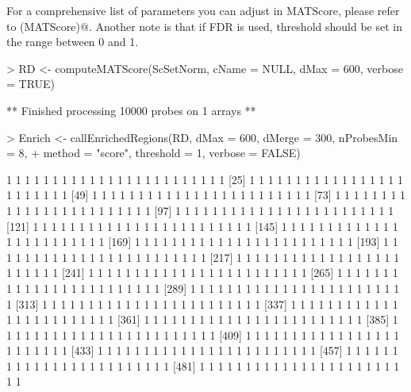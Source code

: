 \documentclass[11pt]{article}
\begin{document}
For a comprehensive list of parameters you can adjust in MATScore, please refer to \verb@help(MATScore)@.
Another note is that if FDR is used, threshold should be set in the range between 0 and 1.

\begin{Schunk}
\begin{Sinput}
> RD <- computeMATScore(ScSetNorm, cName = NULL, dMax = 600, verbose = TRUE)
\end{Sinput}
\begin{Soutput}
** Finished processing  10000  probes on  1  arrays **
\end{Soutput}
\begin{Sinput}
> Enrich <- callEnrichedRegions(RD, dMax = 600, dMerge = 300, nProbesMin = 8, 
+     method = "score", threshold = 1, verbose = FALSE)
\end{Sinput}
\begin{Soutput}
    [1]  1  1  1  1  1  1  1  1  1  1  1  1  1  1  1  1  1  1  1  1  1  1  1  1
   [25]  1  1  1  1  1  1  1  1  1  1  1  1  1  1  1  1  1  1  1  1  1  1  1  1
   [49]  1  1  1  1  1  1  1  1  1  1  1  1  1  1  1  1  1  1  1  1  1  1  1  1
   [73]  1  1  1  1  1  1  1  1  1  1  1  1  1  1  1  1  1  1  1  1  1  1  1  1
   [97]  1  1  1  1  1  1  1  1  1  1  1  1  1  1  1  1  1  1  1  1  1  1  1  1
  [121]  1  1  1  1  1  1  1  1  1  1  1  1  1  1  1  1  1  1  1  1  1  1  1  1
  [145]  1  1  1  1  1  1  1  1  1  1  1  1  1  1  1  1  1  1  1  1  1  1  1  1
  [169]  1  1  1  1  1  1  1  1  1  1  1  1  1  1  1  1  1  1  1  1  1  1  1  1
  [193]  1  1  1  1  1  1  1  1  1  1  1  1  1  1  1  1  1  1  1  1  1  1  1  1
  [217]  1  1  1  1  1  1  1  1  1  1  1  1  1  1  1  1  1  1  1  1  1  1  1  1
  [241]  1  1  1  1  1  1  1  1  1  1  1  1  1  1  1  1  1  1  1  1  1  1  1  1
  [265]  1  1  1  1  1  1  1  1  1  1  1  1  1  1  1  1  1  1  1  1  1  1  1  1
  [289]  1  1  1  1  1  1  1  1  1  1  1  1  1  1  1  1  1  1  1  1  1  1  1  1
  [313]  1  1  1  1  1  1  1  1  1  1  1  1  1  1  1  1  1  1  1  1  1  1  1  1
  [337]  1  1  1  1  1  1  1  1  1  1  1  1  1  1  1  1  1  1  1  1  1  1  1  1
  [361]  1  1  1  1  1  1  1  1  1  1  1  1  1  1  1  1  1  1  1  1  1  1  1  1
  [385]  1  1  1  1  1  1  1  1  1  1  1  1  1  1  1  1  1  1  1  1  1  1  1  1
  [409]  1  1  1  1  1  1  1  1  1  1  1  1  1  1  1  1  1  1  1  1  1  1  1  1
  [433]  1  1  1  1  1  1  1  1  1  1  1  1  1  1  1  1  1  1  1  1  1  1  1  1
  [457]  1  1  1  1  1  1  1  1  1  1  1  1  1  1  1  1  1  1  1  1  1  1  1  1
  [481]  1  1  1  1  1  1  1  1  1  1  1  1  1  1  1  1  1  1  1  1  1  1  1  1

\end{Soutput}
\end{Schunk}
\end{document}
